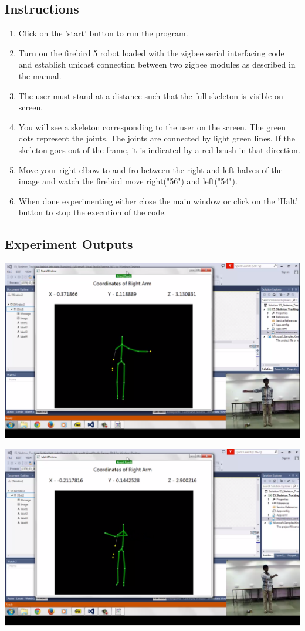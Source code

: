 \begin{flushleft}
\subsection{\textbf{ Instructions}}
\begin{enumerate}
\item Click on the 'start' button to run the program.
\item Turn on the firebird 5 robot loaded with the zigbee serial interfacing code and establish unicast connection between two zigbee modules as described in the manual.
\item The user must stand at a distance such that the full skeleton is visible on screen.
\item You will see a skeleton corresponding to the user on the screen. The green dots represent the joints. The joints are connected by light green lines. If the skeleton goes out of the frame, it is indicated by a red brush in that direction.
\item Move your right elbow to and fro between the right and left halves of the image and watch the firebird move right("56") and left("54").
\item When done experimenting either close the main window or click on the 'Halt' button to stop the execution of the code.
\end{enumerate}
\medskip
\subsection{\textbf{ Experiment Outputs}}
\includegraphics[scale = 0.4]{e51}

\medskip
\includegraphics[scale = 0.4]{e52}
\medskip

\end{flushleft}
